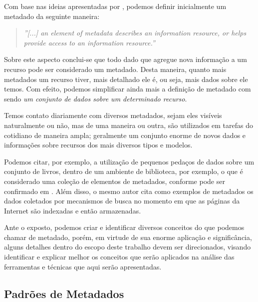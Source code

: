 \begin{textnew}

Com base nas ideias apresentadas por \cite{meta-dados}, podemos definir inicialmente um metadado da seguinte maneira:

\begin{quote}
    \textit{''[...] an element of metadata describes an information resource, or helps provide access to an information resource.''}
\end{quote}

Sobre este aspecto conclui-se que todo dado que agregue nova informação a um recurso pode ser considerado um metadado. Desta maneira, quanto mais metadados um recurso tiver, mais detalhado ele é, ou seja, mais dados sobre ele temos. Com efeito, podemos simplificar ainda mais a definição de metadado com sendo \textit{um conjunto de dados sobre um determinado recurso}.

Temos contato diariamente com diversos metadados, sejam eles visíveis naturalmente ou não, mas de uma maneira ou outra, são utilizados em tarefas do cotidiano de maneira ampla; geralmente um conjunto enorme de novos dados e informações sobre recursos dos mais diversos tipos e modelos.

Podemos citar, por exemplo, a utilização de pequenos pedaços de dados sobre um conjunto de livros, dentro de um ambiente de biblioteca, por exemplo, o que é considerado uma coleção de elementos de metadados, conforme pode ser confirmado em \cite{meta-dados}. Além disso, o mesmo autor cita como exemplos de metadados os dados coletados por mecanismos de busca no momento em que as páginas da Internet são indexadas e então armazenadas.

Ante o exposto, podemos criar e identificar diversos conceitos do que podemos chamar de metadado, porém, em virtude de sua enorme aplicação e significância, alguns detalhes dentro do escopo deste trabalho devem ser direcionados, visando identificar e explicar melhor os conceitos que serão aplicados na análise das ferramentas e técnicas que aqui serão apresentadas.

\end{textnew}

\subsection{Padrões de Metadados}
\label{ssec:metadata-patterns}

